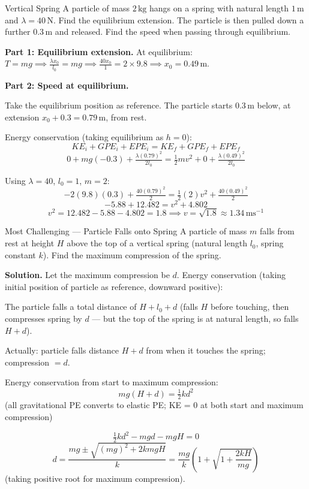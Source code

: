 \documentclass[12pt, a4paper]{book}
\newcommand{\ms}{\,\mathrm{ms}^{-1}}
\newcommand{\kg}{\,\mathrm{kg}}
\newcommand{\m}{\,\mathrm{m}}
\newcommand{\N}{\,\mathrm{N}}
\begin{document}
\begin{exmp}{Vertical Spring}{}
A particle of mass $2\kg$ hangs on a spring with natural length $1\m$ and $\lambda = 40\N$. Find the equilibrium extension. The particle is then pulled down a further $0.3\m$ and released. Find the speed when passing through equilibrium.

\medskip
\textbf{Part 1: Equilibrium extension.}
At equilibrium: $T = mg \implies \frac{\lambda x_0}{l_0} = mg \implies \frac{40x_0}{1} = 2 \times 9.8 \implies x_0 = 0.49\m$.

\textbf{Part 2: Speed at equilibrium.}

Take the equilibrium position as reference. The particle starts $0.3\m$ below, at extension $x_0 + 0.3 = 0.79\m$, from rest.

Energy conservation (taking equilibrium as $h = 0$):
\[
  KE_i + GPE_i + EPE_i = KE_f + GPE_f + EPE_f
\]
\[
  0 + mg(-0.3) + \tfrac{\lambda(0.79)^2}{2l_0} = \tfrac{1}{2}mv^2 + 0 + \tfrac{\lambda(0.49)^2}{2l_0}
\]

Using $\lambda = 40$, $l_0 = 1$, $m = 2$:
\[
  -2(9.8)(0.3) + \tfrac{40(0.79)^2}{2} = \tfrac{1}{2}(2)v^2 + \tfrac{40(0.49)^2}{2}
\]
\[
  -5.88 + 12.482 = v^2 + 4.802
\]
\[
  v^2 = 12.482 - 5.88 - 4.802 = 1.8 \implies v = \sqrt{1.8} \approx 1.34\ms
\]
\end{exmp}

\begin{exmp}{Most Challenging --- Particle Falls onto Spring}{}
A particle of mass $m$ falls from rest at height $H$ above the top of a vertical spring (natural length $l_0$, spring constant $k$). Find the maximum compression of the spring.

\medskip
\textbf{Solution.} Let the maximum compression be $d$. Energy conservation (taking initial position of particle as reference, downward positive):

The particle falls a total distance of $H + l_0 + d$ (falls $H$ before touching, then compresses spring by $d$ --- but the top of the spring is at natural length, so falls $H + d$). 

Actually: particle falls distance $H + d$ from when it touches the spring; compression $= d$.

Energy conservation from start to maximum compression:
\[
  mg(H + d) = \tfrac{1}{2}kd^2
\]
(all gravitational PE converts to elastic PE; KE = 0 at both start and maximum compression)

\[
  \tfrac{1}{2}kd^2 - mgd - mgH = 0
\]
\[
  d = \frac{mg \pm \sqrt{(mg)^2 + 2kmgH}}{k} = \frac{mg}{k}\left(1 + \sqrt{1 + \frac{2kH}{mg}}\right)
\]
(taking positive root for maximum compression).
\end{exmp}
\end{document}
